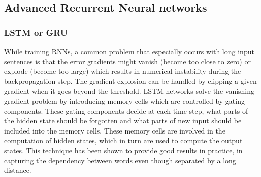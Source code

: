 \documentclass[a4paper, 11pt]{article}
\begin{document}
\subsection{Advanced Recurrent Neural networks }

\subsubsection{LSTM or GRU}

While training RNNs, a common problem that especially occurs with long input sentences is that the error gradients might vanish (become too close to zero) or explode (become too large) which results in numerical instability during the backpropagation step. The gradient explosion can be handled by clipping a given gradient when it goes beyond the threshold. LSTM networks \parencite{Hochreiter1997} solve the vanishing gradient problem by introducing memory cells which are controlled by gating components. These gating components decide at each time step, what parts of the hidden state should be forgotten and what parts of new input should be included into the memory cells. These memory cells are involved in the computation of hidden states, which in turn are used to compute the output states. This technique has been shown to provide good results in practice, in capturing the dependency between words even though separated by a long distance.

\end{document}

